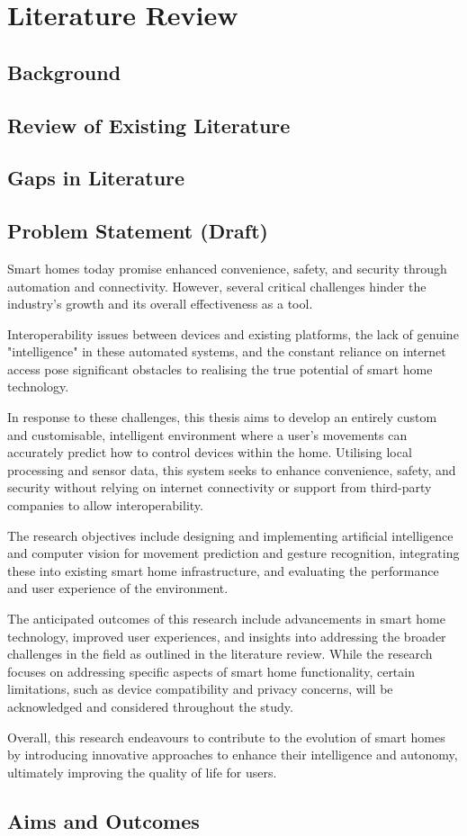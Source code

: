 \chapter{Literature Review}\label{ch:lit_review}

\section{Background}

\section{Review of Existing Literature}

\section{Gaps in Literature}

\section{Problem Statement (Draft)}
Smart homes today promise enhanced convenience, safety, and security through automation and connectivity.
However, several critical challenges hinder the industry's growth and its overall effectiveness as a tool.

Interoperability issues between devices and existing platforms, the lack of genuine "intelligence" in these automated systems, and the constant reliance on internet access pose significant obstacles to realising the true potential of smart home technology.

In response to these challenges, this thesis aims to develop an entirely custom and customisable, intelligent environment where a user's movements can accurately predict how to control devices within the home.
Utilising local processing and sensor data, this system seeks to enhance convenience, safety, and security without relying on internet connectivity or support from third-party companies to allow interoperability.

The research objectives include designing and implementing artificial intelligence and computer vision for movement prediction and gesture recognition, integrating these into existing smart home infrastructure, and evaluating the performance and user experience of the environment.

The anticipated outcomes of this research include advancements in smart home technology, improved user experiences, and insights into addressing the broader challenges in the field as outlined in the literature review.
While the research focuses on addressing specific aspects of smart home functionality, certain limitations, such as device compatibility and privacy concerns, will be acknowledged and considered throughout the study.

Overall, this research endeavours to contribute to the evolution of smart homes by introducing innovative approaches to enhance their intelligence and autonomy, ultimately improving the quality of life for users.

\section{Aims and Outcomes}